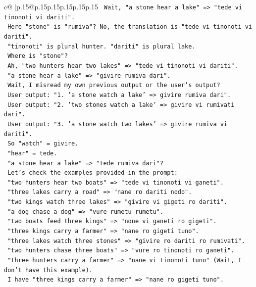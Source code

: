 \documentclass{article}
\begin{document}
{\begin{supertabular}{c@{$\;$}|p{.15\linewidth}@{}p{.15\linewidth}p{.15\linewidth}p{.15\linewidth}p{.15\linewidth}p{.15\linewidth}}
{{{\texttt{   Wait, "a stone hear a lake" => "tede vi tinonoti vi dariti".} \\
\texttt{   Here "stone" is "rumiva"? No, the translation is "tede vi tinonoti vi dariti".} \\
\texttt{   "tinonoti" is plural hunter. "dariti" is plural lake.} \\
\texttt{   Where is "stone"?} \\
\texttt{   Ah, "two hunters hear two lakes" => "tede vi tinonoti vi dariti".} \\
\texttt{   "a stone hear a lake" => "givire rumiva dari".} \\
\texttt{   Wait, I misread my own previous output or the user's output?} \\
\texttt{   User output: "1. 'a stone watch a lake' => givire rumiva dari".} \\
\texttt{   User output: "2. 'two stones watch a lake' => givire vi rumivati dari".} \\
\texttt{   User output: "3. 'a stone watch two lakes' => givire rumiva vi dariti".} \\
\texttt{   So "watch" = givire.} \\
\texttt{   "hear" = tede.} \\
\texttt{   "a stone hear a lake" => "tede rumiva dari"?} \\
\texttt{   Let's check the examples provided in the prompt:} \\
\texttt{   "two hunters hear two boats" => "tede vi tinonoti vi ganeti".} \\
\texttt{   "three lakes carry a road" => "nane ro dariti nodo".} \\
\texttt{   "two kings watch three lakes" => "givire vi gigeti ro dariti".} \\
\texttt{   "a dog chase a dog" => "vure rumetu rumetu".} \\
\texttt{   "two boats feed three kings" => "none vi ganeti ro gigeti".} \\
\texttt{   "three kings carry a farmer" => "nane ro gigeti tuno".} \\
\texttt{   "three lakes watch three stones" => "givire ro dariti ro rumivati".} \\
\texttt{   "two hunters chase three boats" => "vure ro tinonoti ro ganeti".} \\
\texttt{   "three hunters carry a farmer" => "nane vi tinonoti tuno" (Wait, I don't have this example).} \\
\texttt{   I have "three kings carry a farmer" => "nane ro gigeti tuno".} \\
}}}
\end{supertabular}}
\end{document}
